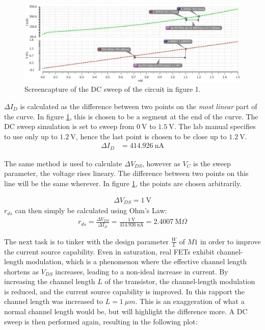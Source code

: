 \documentclass[onecolumn]{article}
\begin{document}
\clearpage 

\begin{figure}[h!]
    \centering
    \includegraphics[width=1\textwidth]{plot_circuit_c_FINAL.png}
    \caption{Screencapture of the DC sweep of the circuit in figure 1.}
    \label{fig:plotc}
\end{figure}

$\Delta I_D$ is calculated as the difference between two points on the \textit{most linear} part of the curve. In figure \ref{fig:plotc}, this is chosen to be a segment at the end of the curve. The DC sweep simulation is set to sweep from $0 \ \text{V}$ to $1.5 \ \text{V}$. The lab manual specifies to use only up to $1.2 \ \text{V}$, hence the last point is chosen to be close up to $1.2 \ \text{V}$.
\begin{align}
    \Delta I_D &= 414.926 \ \text{nA}
\end{align}

The same method is used to calculate $\Delta V_{DS}$, however as $V_C$ is the sweep parameter, the voltage rises lineary. The difference between two points on this line will be the same wherever. In figure \ref{fig:plotc}, the points are chosen arbitrarily.

\begin{align}
    \Delta V_{DS} = 1 \ \text{V}
\end{align}
$r_{ds}$ can then simply be calculated using Ohm's Law:
\begin{align}
    r_{ds} = \frac{\Delta V_{DS}}{\Delta  I_D} = \frac{ 1 \ \text{V}}{414.926 \ \text{nA}} = 2.4007 \ \text{M}\Omega
\end{align}

The next task is to tinker with the design parameter $\frac{W}{L}$ of $M1$ in order to improve the current source capability. Even in saturation, real FETs exhibit channel-length modulation, which is a phenomenon where the effective channel length shortens as $V_{DS}$ increases, leading to a non-ideal increase in current. By increasing the channel length $L$ of the transistor, the channel-length modulation is reduced, and the current source capability is improved.
In this rapport the channel length was increased to $L = 1 \ \mu m$. This is an exaggeration of what a normal channel length would be, but will highlight the difference more. A DC sweep is then performed again, resulting in the following plot: 
\end{document}
